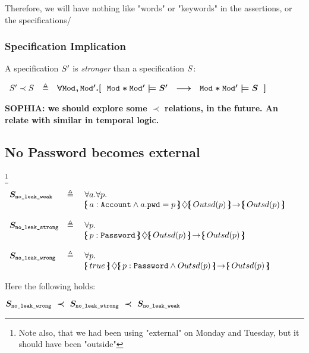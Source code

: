 Therefore, we will have nothing like "words" or "keywords" in the assertions, or the specifications/

\subsubsection{Specification Implication}


\begin{definition}
A specification $\boldmath{S}{'}$ is \emph{stronger} than a specification $\boldmath{S}{}$:

$\begin{array}{lll}
 \SpecB{'}\prec \SpecB{} & \triangleq &  \forall  \Mod,\Mod'. [\ \  \Mod*\Mod'\models \SpecB{'} \ \ \longrightarrow\ \   \Mod*\Mod' \models \SpecB{}\ \ ] \end{array}
$

\end{definition}

\textbf{SOPHIA: we should explore some $\prec$ relations, in the future. An relate with similar in temporal logic.}

\subsection{No Password becomes external}\footnote{Note also, that we had been using "external" on Monday and Tuesday, but it should have been "outside"}

$\begin{array}{lll}
 \Spec{no\_leak\_weak} & \triangleq &  \forall a.  \forall p.\\
 & &   \onlyIf{a:\prg{Account}\wedge a.\prg{pwd}=p}{\outside{p}} {\outside{p}}\   
~ \\
\\
 \Spec{no\_leak\_strong} & \triangleq &  \forall p.\\
 & &   \onlyIf{p:\prg{Password}} {\outside{p}} {\outside{p}}\  \\
 ~ \\
 \Spec{no\_leak\_wrong} & \triangleq\ & \forall p. \\
 & &    \onlyIf{true} {p:\prg{Password} \wedge \outside{p}} {\outside{p}} 

\end{array}
$

\vspace{.1in}
\noindent
Here the following holds:

$\Spec{no\_leak\_wrong}  \ \prec\ \Spec{no\_leak\_strong}  \ \prec \ \Spec{no\_leak\_weak} $

